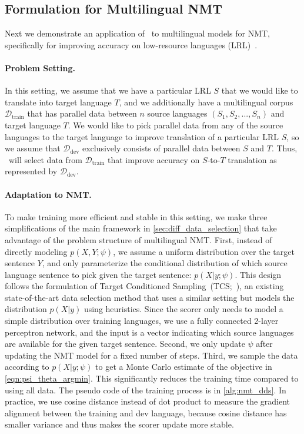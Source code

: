 \subsection{\label{sec:nmt_method}Formulation for Multilingual NMT}

Next we demonstrate an application of \dds~to multilingual models for NMT, specifically for improving accuracy on low-resource languages (LRL)~\citep{nmt_transfer,rapid_adapt_nmt}.

\paragraph{Problem Setting.} In this setting, we assume that we have a particular LRL $S$ that we would like to translate into target language $T$, and we additionally have a multilingual corpus $\mathcal{D}_{\text{train}}$ that has parallel data between $n$ source languages $(S_1, S_2, ..., S_n)$ and target language $T$. We would like to pick parallel data from any of the source languages to the target language to improve translation of a particular LRL $S$, so we assume that $\mathcal{D}_{\text{dev}}$ exclusively consists of parallel data between $S$ and $T$.
Thus, \dds~will select data from $\mathcal{D}_{\text{train}}$ that improve accuracy on $S$-to-$T$ translation as represented by $\mathcal{D}_{\text{dev}}$.

\paragraph{Adaptation to NMT.} To make training more efficient and stable in this setting, we make three simplifications of the main framework in \autoref{sec:diff_data_selection} that take advantage of the problem structure of multilingual NMT.
First, instead of directly modeling $p(X,Y;\psi)$, we assume a uniform distribution over the target sentence $Y$, and only parameterize the conditional distribution of which source language sentence to pick given the target sentence: $p(X|y;\psi)$. This design follows the formulation of Target Conditioned Sampling~(TCS;~\citet{TCS}), an existing state-of-the-art data selection method that uses a similar setting but models the distribution $p(X|y)$ using heuristics.  Since the scorer only needs to model a simple distribution over training languages, we use a fully connected 2-layer perceptron network, and the input is a vector indicating which source languages are available for the given target sentence.
Second, we only update $\psi$ after updating the NMT model for a fixed number of steps.
Third, we sample the data according to $p(X|y;\psi)$ to get a Monte Carlo estimate of the objective in \autoref{eqn:psi_theta_argmin}.
This significantly reduces the training time compared to using all data. The pseudo code of the training process is in \autoref{alg:nmt_dds}. In practice, we use cosine distance instead of dot product to measure the gradient alignment between the training and dev language, because cosine distance has smaller variance and thus makes the scorer update more stable.

